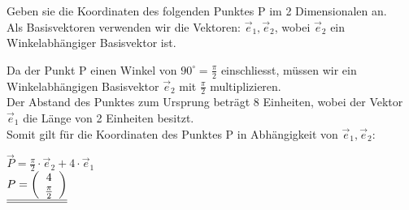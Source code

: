 \beginbsp
Geben sie die Koordinaten des folgenden Punktes P im 2 Dimensionalen an.
\\
Als Basisvektoren verwenden wir die Vektoren: $ \vec{e}_1, \vec{e}_2$, wobei $\vec{e}_2$ ein Winkelabhängiger Basisvektor ist.
\begin{center}

\end{center}
\iend
{}
\beginbsp
Da der Punkt P einen Winkel von $90^\circ = \frac{\pi}{2}$ einschliesst, müssen wir ein Winkelabhängigen Basisvektor $\vec{e}_2$ mit $\frac{\pi}{2}$ multiplizieren. \\
Der Abstand des Punktes zum Ursprung beträgt 8 Einheiten, wobei der Vektor $\vec{e}_1$ die Länge von 2 Einheiten besitzt. \\
Somit gilt für die Koordinaten des Punktes P in Abhängigkeit von $\vec{e}_1 , \vec{e}_2$:
\begin{center}
	$\vec{P} = \frac{\pi}{2} \cdot \vec{e}_2 + 4\cdot \vec{e}_1$
	\\ $\displaystyle \underline{\underline{P = \left ( \begin{array}{c} 4 \\ \frac{\pi}{2} \end{array}\right)}}$
\end{center}

\iend
\newpage





